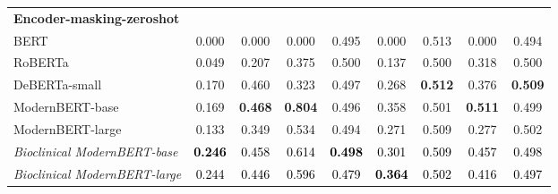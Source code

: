 \begin{table}[htbp]
\begin{ChSevenFloatBody}
{\begin{tabular}{lcccccccc}
\midrule
\textbf{Encoder-masking-zeroshot} &&&&&&&&\\
BERT & 0.000 & 0.000 & 0.000 & 0.495 & 0.000 & 0.513 & 0.000 & 0.494 \\
RoBERTa & 0.049 & 0.207 & 0.375 & 0.500 & 0.137 & 0.500 & 0.318 & 0.500 \\
DeBERTa-small & 0.170 & 0.460 & 0.323 & 0.497 & 0.268 & \textbf{0.512} & 0.376 & \textbf{0.509} \\
ModernBERT-base & 0.169 & \textbf{0.468} & \textbf{0.804} & 0.496 & 0.358 & 0.501 & \textbf{0.511} & 0.499 \\
ModernBERT-large & 0.133 & 0.349 & 0.534 & 0.494 & 0.271 & 0.509 & 0.277 & 0.502 \\
\textit{Bioclinical ModernBERT-base} & \textcolor{black}{\textbf{0.246}} & \textcolor{black}{0.458} & \textcolor{black}{0.614} & \textcolor{black}{\textbf{0.498}} & \textcolor{black}{0.301} & \textcolor{black}{0.509} & \textcolor{black}{0.457} & \textcolor{black}{0.498} \\
\textit{Bioclinical ModernBERT-large} & \textcolor{black}{0.244} & \textcolor{black}{0.446} & \textcolor{black}{0.596} & \textcolor{black}{0.479} & \textcolor{black}{\textbf{0.364}} & \textcolor{black}{0.502} & \textcolor{black}{0.416} & \textcolor{black}{0.497} \\
\bottomrule
\end{tabular}
}



\end{ChSevenFloatBody}
\end{table}